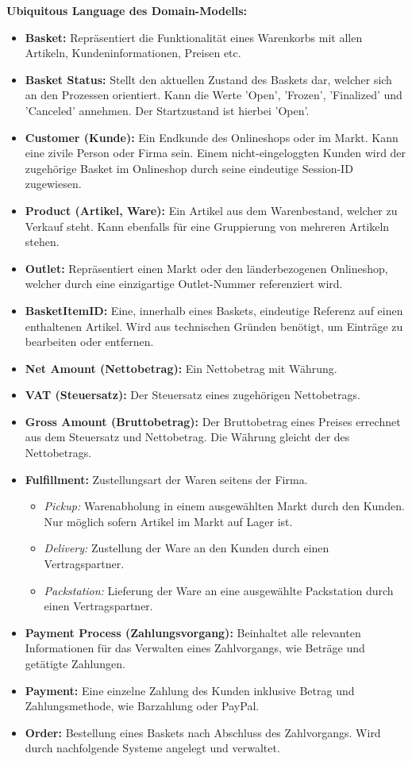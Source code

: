 {\large \textbf{Ubiquitous Language des Domain-Modells:}}
\begin{itemize}[topsep=-3px]
	\item \textbf{Basket: } {Repräsentiert die Funktionalität eines Warenkorbs mit allen Artikeln, Kundeninformationen, Preisen etc.}
	\item \textbf{Basket Status: } {Stellt den aktuellen Zustand des Baskets dar, welcher sich an den Prozessen orientiert. Kann die Werte 'Open', 'Frozen', 'Finalized' und 'Canceled' annehmen. Der Startzustand ist hierbei 'Open'.}
	\item \textbf{Customer (Kunde): } {Ein Endkunde des Onlineshops oder im Markt. Kann eine zivile Person oder Firma sein. Einem nicht-eingeloggten Kunden wird der zugehörige Basket im Onlineshop durch seine eindeutige Session-ID zugewiesen.} 
	\item \textbf{Product (Artikel, Ware): } {Ein Artikel aus dem Warenbestand, welcher zu Verkauf steht. Kann ebenfalls für eine Gruppierung von mehreren Artikeln stehen.}
	\item \textbf{Outlet: } {Repräsentiert einen Markt oder den länderbezogenen Onlineshop, welcher durch eine einzigartige Outlet-Nummer referenziert wird.}
	\item \textbf{BasketItemID: } {Eine, innerhalb eines Baskets, eindeutige Referenz auf einen enthaltenen Artikel. Wird aus technischen Gründen benötigt, um Einträge zu bearbeiten oder entfernen.}
	\item \textbf{Net Amount (Nettobetrag): } {Ein Nettobetrag mit Währung.}
	\item \textbf{VAT (Steuersatz): } {Der Steuersatz eines zugehörigen Nettobetrags.}
	\item \textbf{Gross Amount (Bruttobetrag): } {Der Bruttobetrag eines Preises errechnet aus dem Steuersatz und Nettobetrag. Die Währung gleicht der des Nettobetrags.}
	\item \textbf{Fulfillment: } {Zustellungsart der Waren seitens der Firma.}
	\begin{itemize}[noitemsep,nolistsep, topsep=-5px]
		\item \textit{Pickup: } {Warenabholung in einem ausgewählten Markt durch den Kunden. Nur möglich sofern Artikel im Markt auf Lager ist.}
		\item \textit{Delivery: } {Zustellung der Ware an den Kunden durch einen Vertragspartner.}
		\item \textit{Packstation: } {Lieferung der Ware an eine ausgewählte Packstation durch einen Vertragspartner.}
	\end{itemize}
	\item \textbf{Payment Process (Zahlungsvorgang): } {Beinhaltet alle relevanten Informationen für das Verwalten eines Zahlvorgangs, wie Beträge und getätigte Zahlungen.}
	\item \textbf{Payment: } {Eine einzelne Zahlung des Kunden inklusive Betrag und Zahlungsmethode, wie Barzahlung oder PayPal.}
	\item \textbf{Order: } {Bestellung eines Baskets nach Abschluss des Zahlvorgangs. Wird durch nachfolgende Systeme angelegt und verwaltet.}
\end{itemize}

